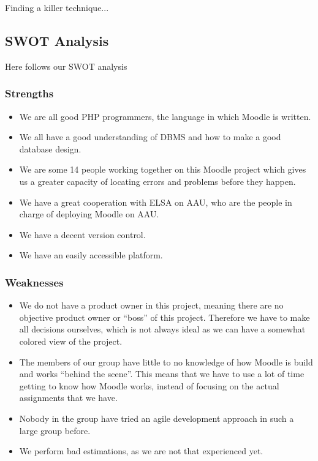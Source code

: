 Finding a killer technique... 

\subsection{SWOT Analysis}

Here follows our SWOT analysis
\subsubsection{Strengths}
\begin{itemize}
	\item We are all good PHP programmers, the language in which Moodle is written. 
	\item We all have a good understanding of DBMS and how to make a good database design. 
	\item We are some 14 people working together on this Moodle project which gives us a greater capacity of locating errors and problems before they happen. 
	\item We have a great cooperation with ELSA on AAU, who are the people in charge of deploying Moodle on AAU.
	\item We have a decent version control.
	\item We have an easily accessible platform.
\end{itemize}


\subsubsection{Weaknesses}
\begin{itemize}
	\item We do not have a product owner in this project, meaning there are no objective product owner or ``boss'' of this project. Therefore we have to make all decisions ourselves, which is not always ideal as we can have a somewhat colored view of the project.
	\item The members of our group have little to no knowledge of how Moodle is build and works ``behind the scene''. This means that we have to use a lot of time getting to know how Moodle works, instead of focusing on the actual assignments that we have.
	\item Nobody in the group have tried an agile development approach in such a large group before.
	\item We perform bad estimations, as we are not that experienced yet.
\end{itemize}


